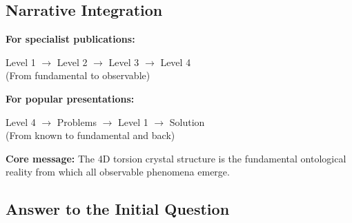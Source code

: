 	\begin{table}[H]
		\centering
		\caption{The four ontological levels of T0 theory}
	\end{table}
	
	\subsection{Narrative Integration}
	
	\begin{keyresult}
		\textbf{For specialist publications:}
		\begin{center}
			Level 1 $\to$ Level 2 $\to$ Level 3 $\to$ Level 4\\
			(From fundamental to observable)
		\end{center}
		
		\vspace{0.3cm}
		
		\textbf{For popular presentations:}
		\begin{center}
			Level 4 $\to$ Problems $\to$ Level 1 $\to$ Solution\\
			(From known to fundamental and back)
		\end{center}
		
		\vspace{0.3cm}
		
		\textbf{Core message:}
		The 4D torsion crystal structure is the fundamental ontological reality from which all observable phenomena emerge.
	\end{keyresult}
	
	\subsection{Answer to the Initial Question}
	
